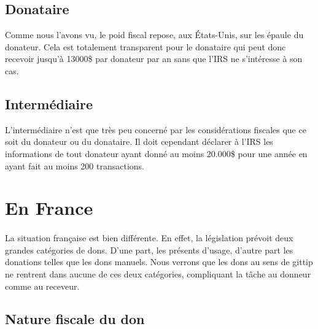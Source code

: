         \subsection{Donataire}
            Comme nous l'avons vu, le poid fiscal repose, aux États-Unis,
            sur les épaule du donateur. Cela est totalement transparent
            pour le donataire qui peut donc recevoir jusqu'à 13000\$
            par donateur par an sans que l'IRS ne s'intéresse à son cas.
        \subsection{Intermédiaire}
            L'intermédiaire n'est que très peu concerné par les
            considérations fiscales que ce soit du donateur ou du donataire.
            Il doit cependant déclarer à l'IRS les informations de
            tout donateur ayant donné au moins 20.000\$ pour une année en
            ayant fait au moins 200 transactions.
    \section{En France}
        \paragraph{}
            La situation française est bien différente. En effet, la
            législation prévoit deux grandes catégories de dons. D'une
            part, les présents d'usage, d'autre part les donations
            telles que les dons manuels. Nous verrons que les dons au sens
            de gittip ne rentrent dans aucune de ces deux catégories,
            compliquant la tâche au donneur comme au receveur.

        \subsection{Nature fiscale du don}
            
